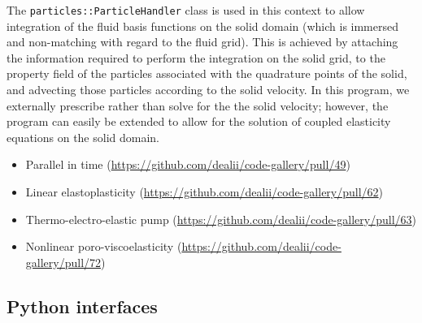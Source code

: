 \documentclass{ansarticle-preprint}
\begin{document}
\begin{itemize}
        The \texttt{particles::ParticleHandler} class is used in this context
        to allow integration of the fluid basis functions on the solid domain
        (which is immersed and non-matching with regard to the fluid grid). This is
        achieved by attaching the information required to perform the
        integration on the solid grid, to the property field of the particles
        associated with the quadrature points of the solid, and advecting those
        particles according to the solid velocity. In this program, we
        externally prescribe rather than solve for the
        the solid velocity; however,
        the program can easily be extended to allow for the solution of
        coupled elasticity equations on the solid domain.
\end{itemize}

\begin{itemize}
  \item Parallel in time (\url{https://github.com/dealii/code-gallery/pull/49})
  \item Linear elastoplasticity (\url{https://github.com/dealii/code-gallery/pull/62})
  \item Thermo-electro-elastic pump (\url{https://github.com/dealii/code-gallery/pull/63})
  \item Nonlinear poro-viscoelasticity (\url{https://github.com/dealii/code-gallery/pull/72})
\end{itemize}

\subsection{Python interfaces}
\label{subsec:python}
\end{document}
